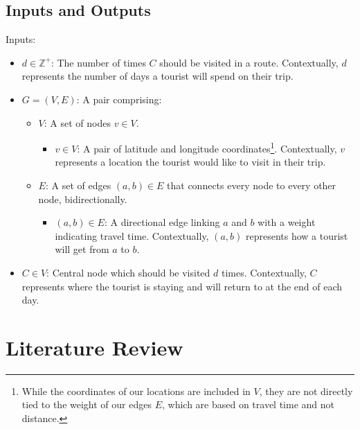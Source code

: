 \documentclass[a4paper,12pt]{article}
\begin{document}
    \subsection{Inputs and Outputs}\label{subsec:inputs-and-outputs}
    Inputs:
    \begin{itemize}
        \item $d \in \mathbb{Z}^+$: The number of times $C$ should be visited in a route.
        Contextually, $d$ represents the number of days a tourist will spend on their trip.
        \item $G = (V, E)$: A pair comprising:
        \begin{itemize}
            \item[\textbullet] $V$: A set of nodes $v \in V$.
            \begin{itemize}
                \item[\textbullet] $v \in V$: A pair of latitude and longitude coordinates\footnote{While the
                coordinates of our locations are included in $V$, they are not directly tied to the weight of our
                edges $E$, which are based on travel time and not distance.}.
                Contextually, $v$ represents a location the tourist would like to visit in their trip.
            \end{itemize}
            \item[\textbullet] $E$: A set of edges $(a, b) \in E$ that connects every node to every other node,
            bidirectionally.
            \begin{itemize}
                \item[\textbullet] $(a, b) \in E$: A directional edge linking $a$ and $b$ with a weight indicating
                travel time.
                Contextually, $(a, b)$ represents how a tourist will get from $a$ to $b$.
            \end{itemize}
        \end{itemize}
        \item $C \in V$: Central node which should be visited $d$ times.
        Contextually, $C$ represents where the tourist is staying and will return to at the end of each day.
    \end{itemize}

    \pagebreak

    \section{Literature Review}\label{sec:literature-review}
\end{document}
